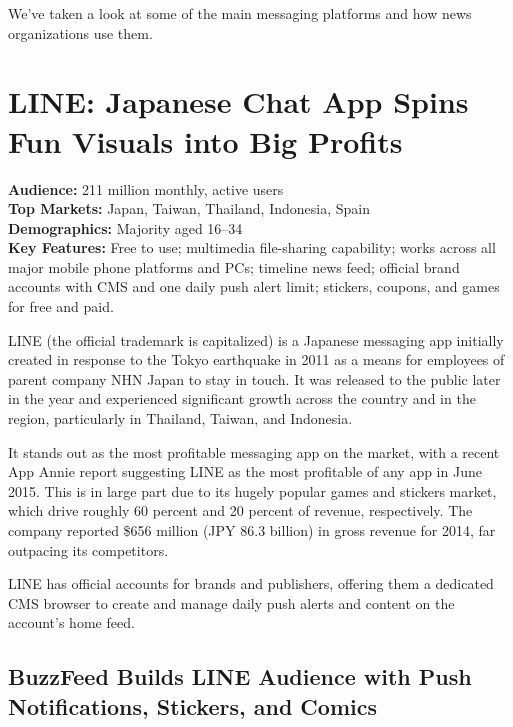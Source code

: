 \documentclass[notoc, symmetric, nobib, nols]{towcenter-guideto-book}
\begin{document}
We've taken a look at some of the main messaging platforms and how news organizations use them.

\section[LINE: Japanese Chat App Spins Fun Visuals into Big Profits]{LINE: Japanese Chat App Spins Fun Visuals \protect\newline into Big Profits}


\begin{framed}
  \noindent\textbf{Audience:} 211 million monthly, active users\\
  \noindent\textbf{Top Markets:} Japan, Taiwan, Thailand, Indonesia, Spain\\
  \noindent\textbf{Demographics:} Majority aged 16--34\\
  \noindent\textbf{Key Features:} Free to use; multimedia file-sharing capability; works across all major mobile phone platforms and PCs; timeline news feed; official brand accounts with CMS and one daily push alert limit; stickers, coupons, and games for free and paid.
\end{framed}

\vspace{\baselineskip}
LINE (the official trademark is capitalized) is a Japanese messaging app initially created in response to the Tokyo earthquake in 2011 as a means for employees of parent company NHN Japan to stay in touch. It was released to the public later in the year and experienced significant growth across the country and in the region, particularly in Thailand, Taiwan, and Indonesia. 

It stands out as the most profitable messaging app on the market, with a recent App Annie report suggesting LINE as the most profitable of any app in June 2015.\autocite{AppAnnie} This is in large part due to its hugely popular games and stickers market, which drive roughly 60 percent and 20 percent of revenue, respectively. The company reported \$656 million (JPY 86.3 billion) in gross revenue for 2014, far outpacing its competitors.\autocite{Line2014results} 

LINE has official accounts for brands and publishers, offering them a dedicated CMS browser to create and manage daily push alerts and content on the account's home feed.

\subsection{BuzzFeed Builds LINE Audience with Push Notifications, Stickers, and Comics}
\end{document}
